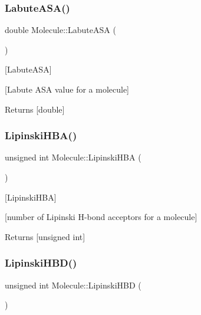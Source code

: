 \subsubsection{\texorpdfstring{Labute\+A\+S\+A()}{LabuteASA()}}
{\footnotesize\ttfamily double Molecule\+::\+Labute\+A\+SA (\begin{DoxyParamCaption}{ }\end{DoxyParamCaption})}



\mbox{[}Labute\+A\+SA\mbox{]} 

\mbox{[}Labute A\+SA value for a molecule\mbox{]}

\begin{DoxyReturn}{Returns}
\mbox{[}double\mbox{]} 
\end{DoxyReturn}
\mbox{\label{class_molecule_aae854241373a2539a0b9421b8d295dd6}} 
\subsubsection{\texorpdfstring{Lipinski\+H\+B\+A()}{LipinskiHBA()}}
{\footnotesize\ttfamily unsigned int Molecule\+::\+Lipinski\+H\+BA (\begin{DoxyParamCaption}{ }\end{DoxyParamCaption})}



\mbox{[}Lipinski\+H\+BA\mbox{]} 

\mbox{[}number of Lipinski H-\/bond acceptors for a molecule\mbox{]}

\begin{DoxyReturn}{Returns}
\mbox{[}unsigned int\mbox{]} 
\end{DoxyReturn}
\mbox{\label{class_molecule_a5b22fcdafd01813f7a554f42dad03aea}} 
\subsubsection{\texorpdfstring{Lipinski\+H\+B\+D()}{LipinskiHBD()}}
{\footnotesize\ttfamily unsigned int Molecule\+::\+Lipinski\+H\+BD (\begin{DoxyParamCaption}{ }\end{DoxyParamCaption})}



